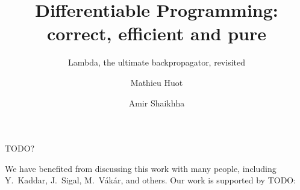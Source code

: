 \documentclass[acmsmall,review,anonymous]{acmart}\settopmatter{printfolios=true,printccs=false,printacmref=false}
\begin{document}
\title{Differentiable Programming: correct, efficient and pure}
\subtitle{Lambda, the ultimate backpropagator, revisited}

\author{Mathieu Huot}

\author{Amir Shaikhha}



\renewcommand{\shortauthors}{Huot, et al.}



\begin{CCSXML}
TODO?
\end{CCSXML}


\maketitle






\begin{acks}
We have benefited from discussing this work with many people, including Y.~Kaddar, J.~Sigal, M.~V\'ak\'ar, and others. 
Our work is supported by TODO:
\end{acks}


\end{document}
